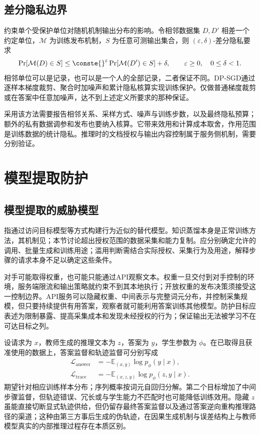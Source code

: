 \documentclass[../textbook.tex]{subfiles}
\begin{document}
\subsection{差分隐私边界}
约束单个受保护单位对随机机制输出分布的影响。令相邻数据集 $D,D'$ 相差一个约定单位，$\mathcal M$ 为训练发布机制，$S$ 为任意可测输出集合，则 $(\varepsilon,\delta)$-差分隐私要求
\begin{equation}
 \Pr[\mathcal M(D)\in S]\le \conste{}^{\varepsilon}\Pr[\mathcal M(D')\in S]+\delta,
 \qquad \varepsilon\ge0,\quad 0\le\delta<1.
\end{equation}
相邻单位可以是记录，也可以是一个人的全部记录，二者保证不同。DP-SGD通过逐样本梯度裁剪、聚合时加噪声和累计隐私核算实现训练保护\cite{abadi2016dp}。仅做普通梯度裁剪或在答案中任意加噪声，达不到上述定义所要求的那种保证。

采用该方法需要报告相邻关系、采样方式、噪声与训练步数，以及最终隐私预算；额外的私有数据调参和发布也要纳入核算。它带来效用和计算成本取舍，作用范围是训练数据的统计隐私。推理时的文档授权与输出内容控制属于服务侧机制，需要分别验证。

\section{模型提取防护}

\subsection{模型提取的威胁模型}
指通过访问目标模型等方式构建行为近似的替代模型。知识蒸馏本身是正常训练方法，其机制见；本节讨论超出授权范围的数据采集和能力复制。应分别确定允许的调用、批量生成和训练用途；滥用判断需结合实际授权、采集行为及用途，解释步骤的请求本身不足以确定这些条件。

对手可能取得权重，也可能只能通过API观察文本。权重一旦交付到对手控制的环境，服务端限流和输出策略就约束不到其本地执行；开放权重的发布决策须接受这一控制边界。API服务可以隐藏权重、中间表示与完整词元分布，并控制采集规模，但只要持续提供有用答案，观察者就可能利用答案训练其他模型。防护目标应表述为限制暴露、提高采集成本和发现未经授权的行为；保证输出无法被学习不在可达目标之列。

设请求为 $x$，教师生成的推理文本为 $z$，答案为 $y$，学生参数为 $\phi$。在已取得且获准使用的数据上，答案监督和轨迹监督可分别写成
\begin{align}
 \mathcal L_{\mathrm{answer}}&=-\mathbb E_{(x,y)}\log p_\phi(y\mid x),\\
 \mathcal L_{\mathrm{trace}}&=-\mathbb E_{(x,z,y)}\log p_\phi(z,y\mid x).
\end{align}
期望针对相应训练样本分布；序列概率按词元自回归分解。第二个目标增加了中间步骤监督，但轨迹错误、冗长或与学生能力不匹配时也可能降低训练效用。隐藏 $z$ 虽能直接切断显式轨迹供给，但仍留存最终答案监督以及通过答案逆向重构推理路径的渠道；这种由第三方事后生成的伪轨迹，在因果生成机制与误差结构上与教师模型真实的内部推理过程存在本质区别。
\end{document}
